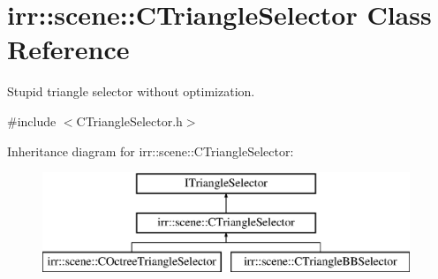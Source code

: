 \hypertarget{classirr_1_1scene_1_1_c_triangle_selector}{\section{irr\-:\-:scene\-:\-:C\-Triangle\-Selector Class Reference}
\label{classirr_1_1scene_1_1_c_triangle_selector}
}


Stupid triangle selector without optimization.  




{\ttfamily \#include $<$C\-Triangle\-Selector.\-h$>$}

Inheritance diagram for irr\-:\-:scene\-:\-:C\-Triangle\-Selector\-:\begin{figure}[H]
\begin{center}
\leavevmode
\includegraphics[height=3.000000cm]{classirr_1_1scene_1_1_c_triangle_selector}
\end{center}
\end{figure}
